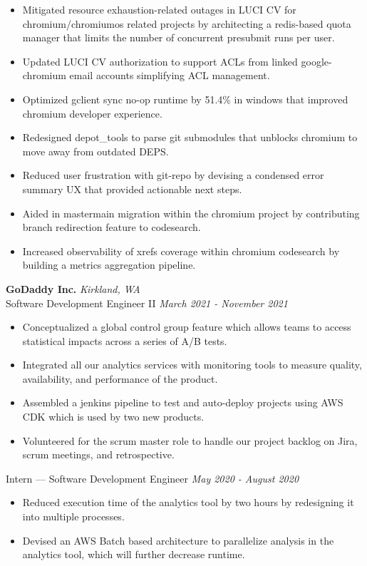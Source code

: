 \documentclass{resume}
\begin{document}
\begin{itemize}
  \item Mitigated resource exhaustion-related outages in LUCI CV for chromium/chromiumos related projects by architecting a redis-based quota manager that limits the number of concurrent presubmit runs per user.
  \item Updated LUCI CV authorization to support ACLs from linked google-chromium email accounts simplifying ACL management.
  \item Optimized gclient sync no-op runtime by 51.4\% in windows that improved chromium developer experience.
  \item Redesigned depot\_tools to parse git submodules that unblocks chromium to move away from outdated DEPS.
  \item Reduced user frustration with git-repo by devising a condensed error summary UX that provided actionable next steps.
  \item Aided in master\textrightarrow main migration within the chromium project by contributing branch redirection feature to codesearch.
  \item Increased observability of xrefs coverage within chromium codesearch by building a metrics aggregation pipeline.
\end{itemize}
\textbf{GoDaddy Inc.} \hfill \textit{Kirkland, WA} \\
{\small Software Development Engineer II} \hfill \textit{\small March 2021 - November 2021}
\begin{itemize}
  \item Conceptualized a global control group feature which allows teams to access statistical impacts across a series of A/B tests.
  \item Integrated all our analytics services with monitoring tools to measure quality, availability, and performance of the product.
  \item Assembled a jenkins pipeline to test and auto-deploy projects using AWS CDK which is used by two new products.
  \item Volunteered for the scrum master role to handle our project backlog on Jira, scrum meetings, and retrospective.
\end{itemize}
{\small Intern --- Software Development Engineer} \hfill \textit{\small May 2020 - August 2020}
\begin{itemize}
  \item Reduced execution time of the analytics tool by two hours by redesigning it into multiple processes.
  \item Devised an AWS Batch based architecture to parallelize analysis in the analytics tool, which will further decrease runtime.
\end{itemize}
\end{document}
